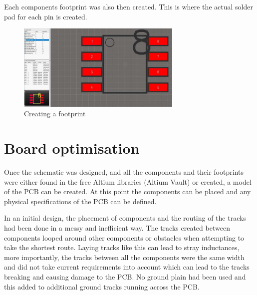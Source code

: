 Each components footprint was also then created. This is where the actual solder pad for each pin is created.
\hspace{5mm}
\begin{figure}[H]
\centering
\includegraphics[width=0.7\textwidth]{footprints.JPG}
\caption{Creating a footprint}
\label{fig:model}
\end{figure} 

\newpage
\section{Board optimisation}

Once the schematic was designed, and all the components and their footprints were either found in the free Altium libraries (Altium Vault) or created, a model of the PCB can be created. At this point the components can be placed and any physical specifications of the PCB can be defined. 

In an initial design, the placement of components and the routing of the tracks had been done in a messy and inefficient way.  The tracks created between components looped around other components or obstacles when attempting to take the shortest route. Laying tracks like this can lead to stray inductances, more importantly, the tracks between all the components were the same width and did not take current requirements into account which can lead to the tracks breaking and causing damage to the PCB. No ground plain had been used and this added to additional ground tracks running across the PCB. 

\vspace{-5mm}
